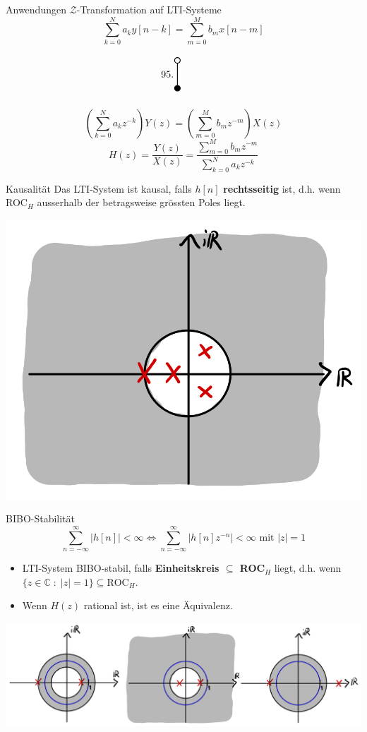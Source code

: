 \documentclass[14pt, aspectratio=169, handout]{beamer}
\newcommand{\verticaltransform}[4]{%
    \begin{tikzpicture}
        \filldraw[thick] (0,0) circle (0.1) node[below=3pt] {$#4$};
        \draw[thick] (0,0.1) -- (0,#2 -0.1) node[midway, left] {#1};
        \draw[thick] (0,#2) circle (0.1) node[above=3pt] {$#3$};
    \end{tikzpicture}%
}
\begin{document}
\begin{frame}{Anwendungen $\mathcal{Z}$-Transformation auf LTI-Systeme}
    $$\sum_{k=0}^N a_k y[n-k] = \sum_{m=0}^M b_m x[n-m]$$ \vspace*{-0.5cm}$$ \verticaltransform{95.}{1}{}{} \hspace{28pt}$$ \vspace*{-1.25cm}$$\left( \sum_{k=0}^N a_k z^{-k} \right)Y(z) = \left( \sum_{m=0}^M b_m z^{-m} \right)X(z) $$
    \vspace*{0.5cm}$$H(z) = \frac{Y(z)}{X(z)} = \frac{\sum_{m=0}^M b_m z^{-m}}{\sum_{k=0}^N a_k z^{-k}}$$
\end{frame}

\begin{frame}{Kausalität}
   Das LTI-System ist kausal, falls $h[n]$ \textbf{rechtsseitig} ist, d.h. wenn ROC$_H$ ausserhalb der betragsweise grössten Poles liegt.
   
            \begin{center}
            \includegraphics[width=0.4\linewidth]{figures/kausal.jpg}
        \end{center}
\end{frame}

\begin{frame}{BIBO-Stabilität}
    $$\sum_{n=-\infty}^\infty |h[n]| < \infty \Leftrightarrow \sum_{n=-\infty}^\infty |h[n]z^{-n}| < \infty \text{ mit } |z|=1$$
    \begin{itemize}
        \item[] LTI-System BIBO-stabil, falls \textbf{Einheitskreis $\subseteq$ ROC}$_H$ liegt, d.h. wenn $\{ z \in \mathbb{C} \; : \; |z| = 1 \} \subseteq \text{ROC}_H$. 
        \item[] Wenn $H(z)$ rational ist, ist es eine Äquivalenz.
    \end{itemize}
    \begin{center}
        \includegraphics[width=0.75\linewidth]{figures/BIBO_stabil.jpg}
    \end{center}
\end{frame}
\end{document}
